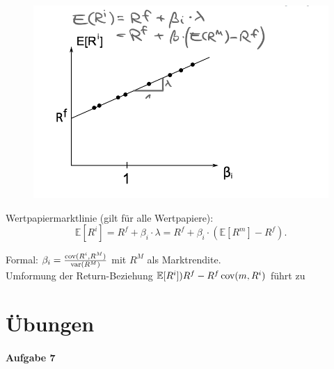 \documentclass[12pt]{extreport} %
\theoremstyle{named}
\theoremstyle{nnamed}
\theoremstyle{itshape}
\theoremstyle{normal}
\begin{document}
\begin{figure}[h!] \centering
	\includegraphics[scale=0.4]{img/p45}
\end{figure}
Wertpapiermarktlinie (gilt für alle Wertpapiere):
$$ \mathbb{E} \left[ R^i \right] = R^f + \beta_i \cdot \lambda = R^f + \beta_i \cdot \left( \mathbb{E}\left[R^m \right] - R^f \right). $$

Formal: $\beta_i = \frac{\operatorname{cov}(R^i, R^M)}{\operatorname{var}(R^M)}$ mit $R^M$ als Marktrendite. ~\\

Umformung der Return-Beziehung $\mathbb{E}[R^i] ) R^f - R^f \operatorname{cov}(m, R^i)$ führt zu


\chapter{Übungen}

\subsubsection*{Aufgabe 7}
\end{document}
